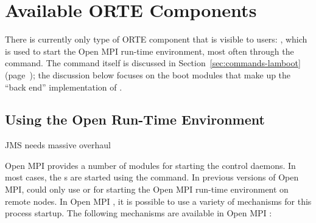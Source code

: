 %
% 
% 
%

\chapter{Available ORTE Components}
\label{sec:mca-orte}

There is currently only type of ORTE component that is visible to
users: , which is used to start the Open MPI run-time
environment, most often through the  command.  The
 command itself is discussed in
Section~\ref{sec:commands-lamboot}
(page~\pageref{sec:commands-lamboot}); the discussion below focuses on
the boot modules that make up the ``back end'' implementation of
.


\section{Using the Open Run-Time Environment}
\label{sec:mca-orte-pls}

{\Huge JMS needs massive overhaul}

Open MPI provides a number of modules for starting the 
control daemons.  In most cases, the s are started using the
 command.  In previous versions of Open MPI,
 could only use  or  for starting
the Open MPI run-time environment on remote nodes.  In Open MPI
\ompiversion, it is possible to use a variety of mechanisms for this
process startup.  The following mechanisms are available in Open MPI
\ompiversion:

